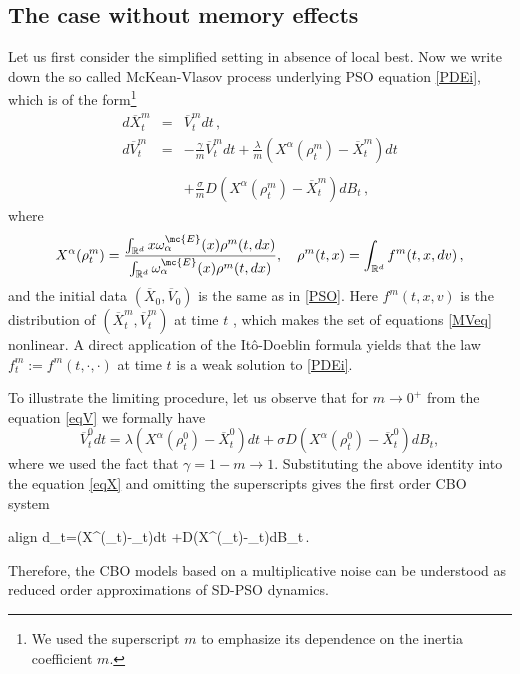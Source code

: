 \documentclass{ims9x6}
\newcommand{\coloredeq}[2]{\begin{empheq}[box={\mymath[colback=gray!13, sharp corners]}]{align}\label{#1}#2\end{empheq}}
\newcommand{\nn}{\nonumber}
\newcommand{\RR}{\mathbb{R}}
\newcommand{\OV}{\overline{V}}
\newcommand{\OX}{\overline{X}}
\begin{document}
\subsection{The case without memory effects}
Let us first consider the simplified setting in absence of local best. 
Now we write down the  so called McKean-Vlasov process \cite{mckean1966class} underlying PSO equation \eqref{PDEi}, which is of the form\footnote{We used the superscript $m$ to emphasize its dependence on the inertia coefficient $m$.}
{ \begin{subequations}\label{MVeq}
	\begin{eqnarray}
	d\OX_t^m&=& \OV_t^mdt\,, \label{eqX}
	\\
	\nn
	d\OV_t^m&=&-\frac{\gamma}{m}\OV_t^mdt+\frac{\lambda}{m}(X^{\alpha}(\rho_t^m)-\OX_t^m)dt\\[-.2cm]
	\label{eqV} 
	\\[-.2cm]\nn
	&& +\frac{\sigma}{m}D(X^{\alpha}(\rho_t^m)-\OX_t^m)dB_t\,, 
	\end{eqnarray}
\end{subequations}}
where 
\begin{equation}\label{14}
X^{\alpha}(\rho_t^m)=\frac{\int_{\RR^d}x\omega_{\alpha}^{\mc{E}}(x)\rho^m(t,dx)}{\int_{\RR^d}\omega_{\alpha}^{\mc{E}}(x)\rho^m(t,dx)}, \quad \rho^m(t,x)=\int_{\RR^d}f^m(t,x,dv)\,,
\end{equation}
and the initial data $(\OX_0,\OV_0)$ is the same as in \eqref{PSO}. Here  $f^m(t,x,v)$ is  the distribution of $(\OX_t^m,\OV_t^m)$ at time $t$ , which makes the set of equations \eqref{MVeq} nonlinear.  A direct application of the It\^{o}-Doeblin formula yields that the law $f_t^m:=f^m(t,\cdot,\cdot)$ at time $t$ is a weak solution to \eqref{PDEi}.

To illustrate the limiting procedure, let us observe that for $m \to 0^+$ from the equation \eqref{eqV} we formally have 
\[
\OV^0_tdt = \lambda\left(X^{\alpha}(\rho_t^0)-\OX^0_t\right)dt+\sigma D(X^{\alpha}(\rho_t^0)-\OX^0_t)dB_t,
\] 
where we used the fact that $\gamma = 1 - m \to 1$. Substituting the above identity into the  equation \eqref{eqX} and omitting the superscripts gives the first order CBO system \cite{carrillo2019consensus}
\coloredeq{MVCBO}{
d\OX_t=\lambda(X^{\alpha}(\rho_t)-\OX_t)dt +\sigma D(X^{\alpha}(\rho_t)-\OX_t)dB_t\,.
}
Therefore, the CBO models based on a multiplicative noise can be understood as reduced order approximations of SD-PSO dynamics. 
\end{document}
